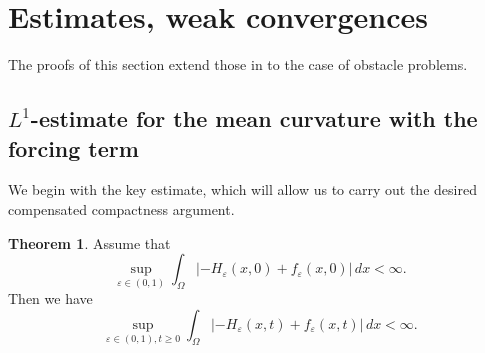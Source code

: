 \documentclass{amsart}
\theoremstyle{definition}
\newtheorem{theorem}[definition]{Theorem}
\begin{document}
\section{Estimates, weak convergences}
The proofs of this section extend those in \cite{MR1315658} to the case of obstacle problems.
\subsection{$L^1$-estimate for the mean curvature with the forcing term}
We begin with the key estimate, which will allow us to carry out the desired compensated compactness argument.
\begin{theorem}\label{thm1.2}
    Assume that
    \begin{equation}
    \sup_{\varepsilon \in (0,1)}
    \int_{\Omega} |-H_\varepsilon (x,0) + f_\varepsilon (x,0)| \, dx <\infty.
    \end{equation}
    Then we have 
    \begin{equation}
    \sup_{\varepsilon \in (0,1),  t\geq 0}
    \int_{\Omega} |-H_\varepsilon (x,t) + f_\varepsilon (x,t)| \, dx <\infty.
    \end{equation}
\end{theorem}
\end{document}
